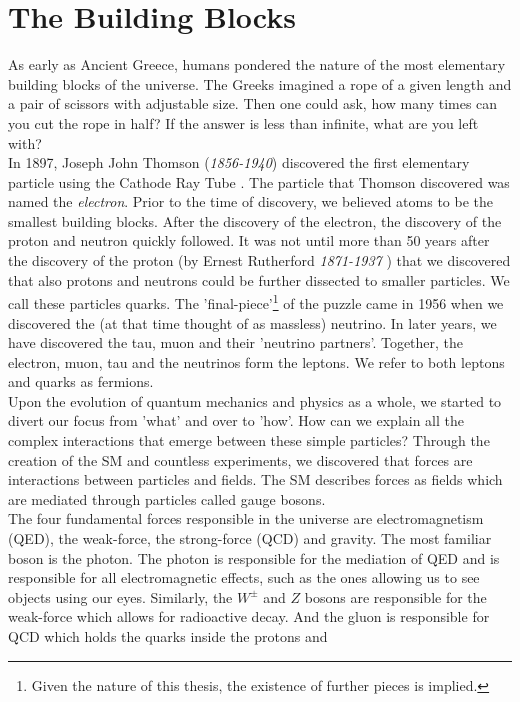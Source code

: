 \section{The Building Blocks}
As early as Ancient Greece, humans pondered the nature of the most elementary building blocks of
the universe. The Greeks imagined a rope of a given length and a pair of scissors with adjustable size.
Then one could ask, how many times can you cut the rope in half? If the answer is less than infinite,
what are you left with?
\\
In 1897, Joseph John Thomson (\emph{1856-1940}) discovered the first elementary particle using the Cathode Ray Tube \cite{JJ}. 
The particle that Thomson discovered was named the \emph{electron}. Prior to the time of discovery, we believed atoms to 
be the smallest building blocks. After the discovery of the electron, the discovery of the 
proton and neutron quickly followed. It was not until more than 50 years after the discovery of 
the proton (by Ernest Rutherford \emph{1871-1937} \cite{Rutherfoord}) that we discovered that also protons and neutrons could be further
dissected to smaller particles. We call these particles quarks. The 'final-piece'\footnote{Given the
nature of this thesis, the existence of further pieces is implied.} of the puzzle came
in 1956 \cite{Reines} when we discovered the (at that time thought of as massless) neutrino. In later years,
we have discovered the tau, muon and their 'neutrino partners'. Together, the 
electron, muon, tau and the neutrinos form the leptons. We refer to both leptons and quarks as fermions.
\\
Upon the evolution of quantum mechanics and physics as a whole, we started to divert
our focus from 'what' and over to 'how'. How can we explain all the complex interactions
that emerge between these simple particles? Through the creation of the \ac{SM} and countless 
experiments, we discovered that forces are interactions between particles and fields.
The \ac{SM} describes forces as fields which are mediated through particles called gauge bosons. 
\\
The four fundamental forces responsible in the universe are electromagnetism (\ac{QED}), the weak-force, 
the strong-force (\ac{QCD}) and gravity. The most familiar boson is the photon. The photon is responsible 
for the mediation of \ac{QED} and is responsible for all electromagnetic effects, such as the ones allowing
us to see objects using our eyes. Similarly, the $W^{\pm}$ and $Z$ bosons are responsible for the weak-force which
allows for radioactive decay. And the gluon is responsible for \ac{QCD} which holds the quarks inside the protons and 
